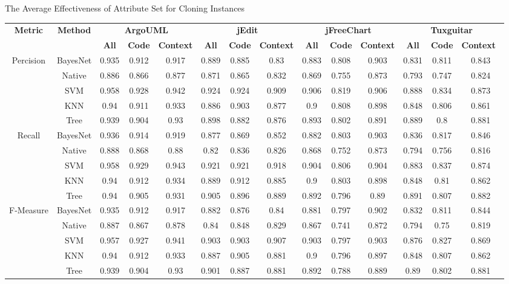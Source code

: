 \begin{table*}[htbp]
{The Average Effectiveness of Attribute Set for Cloning Instances}
\vspace{0.5em}
\centering
\scriptsize
\begin{tabular}{cccccccccccccc}
\toprule[1.5pt]
\multirow{2}{*}{\textbf{Metric}}&\multirow{2}{*}{\textbf{Method}}&\multicolumn{3}{c}{\textbf{ArgoUML}}&\multicolumn{3}{c}{\textbf{jEdit}}&\multicolumn{3}{c}{\textbf{jFreeChart}}&\multicolumn{3}{c}{\textbf{Tuxguitar}}\\
\cline{3-14}
&&\textbf{All}&\textbf{Code}&\textbf{Context}&\textbf{All}&\textbf{Code}&\textbf{Context}&\textbf{All}&\textbf{Code}&\textbf{Context}&\textbf{All}&\textbf{Code}&\textbf{Context}~\\
\midrule[1pt]
\multirow{5}{*}{Percision}
&BayesNet&	0.935&	0.912&	0.917&		0.889&	0.885&	0.83&		0.883&	0.808&	0.903&		0.831&	0.811&	0.843\\
&Native&	0.886&	0.866&	0.877&		0.871&	0.865&	0.832&		0.869&	0.755&	0.873&		0.793&	0.747&	0.824\\
&SVM&	0.958&	0.928&	0.942&		0.924&	0.924&	0.909&		0.906&	0.819&	0.906&		0.888&	0.834&	0.873\\
&KNN&	0.94&	0.911&	0.933&		0.886&	0.903&	0.877&		0.9	&0.808&	0.898&		0.848&	0.806&	0.861\\
&Tree&	0.939&	0.904&	0.93&		0.898&	0.882&	0.876&		0.893&	0.802&	0.891&		0.889&	0.8&	0.881\\
\hline
\multirow{5}{*}{Recall}
&BayesNet&	0.936&	0.914&	0.919&		0.877&	0.869&	0.852&		0.882&	0.803&	0.903&		0.836&	0.817&	0.846\\
&Native&	0.888&	0.868&	0.88&		0.82&	0.836&	0.826&		0.868&	0.752&	0.873&		0.794&	0.756&	0.816\\
&SVM&	0.958&	0.929&	0.943&		0.921&	0.921&	0.918&		0.904&	0.806&	0.904&		0.883&	0.837&	0.874\\
&KNN&	0.94&	0.912&	0.934&		0.889&	0.912&	0.885&		0.9&	0.803&	0.898&		0.848&	0.81&	0.862\\
&Tree&	0.94&	0.905&	0.931&		0.905&	0.896&	0.889&		0.892&	0.796&	0.89&		0.891&	0.807&	0.882\\
\hline
\multirow{5}{*}{F-Measure}
&BayesNet&	0.935&	0.912&	0.917&		0.882&	0.876&	0.84&		0.881&	0.797&	0.902&		0.832&	0.811&	0.844\\
&Native&	0.887&	0.867&	0.878&		0.84&	0.848&	0.829&		0.867&	0.741&	0.872&		0.794&	0.75&	0.819\\
&SVM&	0.957&	0.927&	0.941&		0.903&	0.903&	0.907&		0.903&	0.797&	0.903&		0.876&	0.827&	0.869\\
&KNN&	0.94&	0.912&	0.933&		0.887&	0.905&	0.881&		0.9&	0.796&	0.897&		0.848&	0.807&	0.862\\
&Tree&	0.939&	0.904&	0.93&		0.901&	0.887&	0.881&		0.892&	0.788&	0.889&		0.89&	0.802&	0.881\\
\bottomrule[1.5pt]
\end{tabular}
\end{table*}


